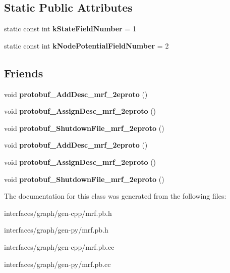\subsection*{Static Public Attributes}
\begin{DoxyCompactItemize}
\item 
\hypertarget{classgraph_1_1NodeStatePotential_a265420a2f3c1e9f0eeda17b43ea4d21f}{
static const int {\bfseries kStateFieldNumber} = 1}
\label{classgraph_1_1NodeStatePotential_a265420a2f3c1e9f0eeda17b43ea4d21f}

\item 
\hypertarget{classgraph_1_1NodeStatePotential_a3a181bd7c694d93d54519675fee7218f}{
static const int {\bfseries kNodePotentialFieldNumber} = 2}
\label{classgraph_1_1NodeStatePotential_a3a181bd7c694d93d54519675fee7218f}

\end{DoxyCompactItemize}
\subsection*{Friends}
\begin{DoxyCompactItemize}
\item 
\hypertarget{classgraph_1_1NodeStatePotential_a7c7daba01236a33140ac99dfb4a21f58}{
void {\bfseries protobuf\_\-AddDesc\_\-mrf\_\-2eproto} ()}
\label{classgraph_1_1NodeStatePotential_a7c7daba01236a33140ac99dfb4a21f58}

\item 
\hypertarget{classgraph_1_1NodeStatePotential_aef3db81db7837e30d95a050165bc180f}{
void {\bfseries protobuf\_\-AssignDesc\_\-mrf\_\-2eproto} ()}
\label{classgraph_1_1NodeStatePotential_aef3db81db7837e30d95a050165bc180f}

\item 
\hypertarget{classgraph_1_1NodeStatePotential_a84e801a5b8303ac698fb7040b250e3d1}{
void {\bfseries protobuf\_\-ShutdownFile\_\-mrf\_\-2eproto} ()}
\label{classgraph_1_1NodeStatePotential_a84e801a5b8303ac698fb7040b250e3d1}

\item 
\hypertarget{classgraph_1_1NodeStatePotential_a7c7daba01236a33140ac99dfb4a21f58}{
void {\bfseries protobuf\_\-AddDesc\_\-mrf\_\-2eproto} ()}
\label{classgraph_1_1NodeStatePotential_a7c7daba01236a33140ac99dfb4a21f58}

\item 
\hypertarget{classgraph_1_1NodeStatePotential_aef3db81db7837e30d95a050165bc180f}{
void {\bfseries protobuf\_\-AssignDesc\_\-mrf\_\-2eproto} ()}
\label{classgraph_1_1NodeStatePotential_aef3db81db7837e30d95a050165bc180f}

\item 
\hypertarget{classgraph_1_1NodeStatePotential_a84e801a5b8303ac698fb7040b250e3d1}{
void {\bfseries protobuf\_\-ShutdownFile\_\-mrf\_\-2eproto} ()}
\label{classgraph_1_1NodeStatePotential_a84e801a5b8303ac698fb7040b250e3d1}

\end{DoxyCompactItemize}


The documentation for this class was generated from the following files:\begin{DoxyCompactItemize}
\item 
interfaces/graph/gen-\/cpp/mrf.pb.h\item 
interfaces/graph/gen-\/py/mrf.pb.h\item 
interfaces/graph/gen-\/cpp/mrf.pb.cc\item 
interfaces/graph/gen-\/py/mrf.pb.cc\end{DoxyCompactItemize}
